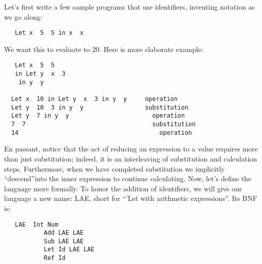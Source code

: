 \documentclass{book}
\newcommand{\lae}{\textsc{LAE}\xspace}
\begin{document}
Let's first write a few sample programs that use identifiers, 
inventing notation as we go along: 

\begin{tabbing}\tt
~~Let~x~~5~~5~in~x~~x
\end{tabbing}

We want this to evaluate to 20. Here is more elaborate example: 

\begin{tabbing}\tt
~~Let~x~~5~~5~\\
\tt ~~~in~Let~y~~x~~3~\\
\tt ~~~~in~y~~y~\\
\tt ~\\
\tt ~~Let~x~~10~in~Let~y~~x~~3~in~y~~y~~~~~operation\\
\tt ~~Let~y~~10~~3~in~y~~y~~~~~~~~~~~~~~~~~substitution~\\
\tt ~~Let~y~~7~in~y~~y~~~~~~~~~~~~~~~~~~~~~~~operation~\\
\tt ~~7~~7~~~~~~~~~~~~~~~~~~~~~~~~~~~~~~~~~~~substitution~\\
\tt ~~14~~~~~~~~~~~~~~~~~~~~~~~~~~~~~~~~~~~~~~~operation~
\end{tabbing}

En passant, notice that the act of reducing an expression to 
a value requires more than just substitution; 
indeed, it is an interleaving of substitution and calculation 
steps. Furthermore, when we have completed 
substitution we implicitly ``descend''into the inner expression to 
continue calculating. Now, let's define the language more 
formally. To honor the addition of identifiers, we will give 
our language a new name: \lae, short for 
``'Let with arithmetic expressions''. Its \textsc{BNF} is: 

\begin{tabbing}\tt
~~LAE~~Int~Num~\\
\tt ~~~~~~~~~~~Add~LAE~LAE\\
\tt ~~~~~~~~~~~Sub~LAE~LAE~\\
\tt ~~~~~~~~~~~Let~Id~LAE~LAE\\
\tt ~~~~~~~~~~~Ref~Id
\end{tabbing}
\end{document}
